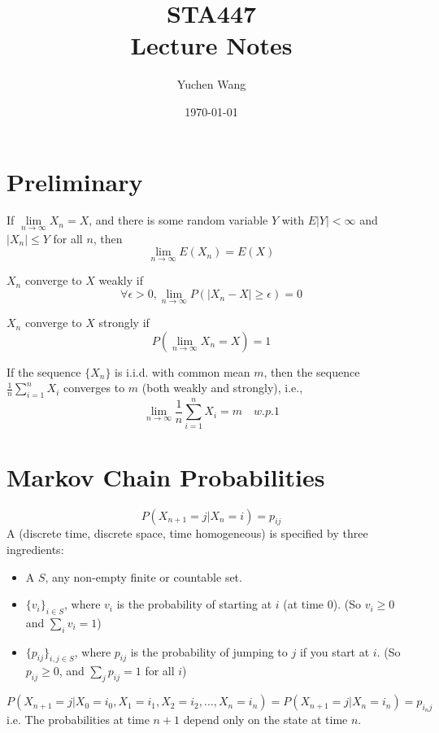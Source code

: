 \documentclass[11pt]{article}
\title{STA447\\ Lecture Notes}
\author{Yuchen Wang}
\date{\today}
\renewcommand{\limit}[1]{\underset{{#1} \rightarrow \infty}{\lim}}
\begin{document}
    \maketitle
    \tableofcontents
    \newpage
    \section{Preliminary}
    If $\limit{n} X_n = X$, and there is some random variable $Y$ with $E|Y|<\infty$ and $|X_n| \leq Y$ for all $n$, then $$\limit{n} E(X_n) = E(X)$$
    
    $X_n$ converge to $X$ weakly if 
    $$\forall \epsilon > 0, \limit{n}P(|X_n - X| \geq \epsilon) = 0$$
   
    $X_n$ converge to $X$ strongly if 
    $$P(\limit{n}X_n = X) = 1$$ 
    
    
    If the sequence $\{X_n\}$ is i.i.d. with common mean $m$, then the sequence $\frac{1}{n}\sum_{i=1}^n X_i$ converges to $m$ (both weakly and strongly), i.e.,
    $$\limit{n} \frac{1}{n}\sum_{i=1}^nX_i = m \quad w.p. 1$$ 


    \section{Markov Chain Probabilities}
    \notation
    $$P(X_{n+1} = j | X_n = i) = p_{ij}$$
     A (discrete time, discrete space, time homogeneous)  is specified by three ingredients:
    \begin{itemize}
    	\item A  $S$, any non-empty finite or countable set.
    	\item {} $\{v_i\}_{i \in S}$, where $v_i$ is the probability of starting at $i$ (at time 0). (So $v_i \geq 0$ and $\sum_i v_i = 1$)
    	\item {} $\{p_{ij}\}_{i, j\in S}$, where $p_{ij}$ is the probability of jumping to $j$ if you start at $i$. (So $p_{ij} \geq 0$, and $\sum_j p_{ij} = 1$ for all $i$)
    \end{itemize}
    
    $$P(X_{n+1} = j | X_0 = i_0, X_1 = i_1, X_2 = i_2, \hdots, X_n = i_n) = P(X_{n+1} = j | X_n = i_n) = p_{i_nj}$$
    i.e. The probabilities at time $n+1$ depend only on the state at time $n$.
    
\end{document}
